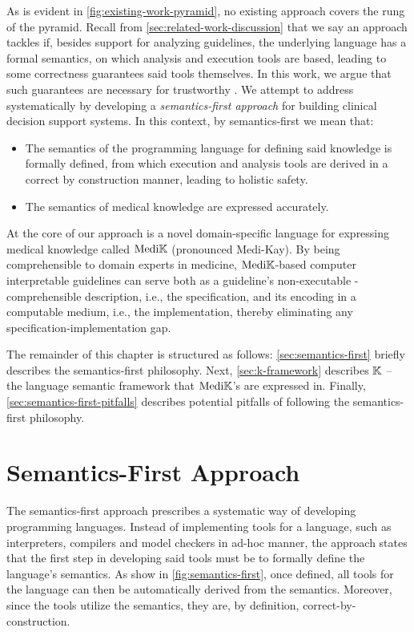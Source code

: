 As is evident in \autoref{fig:existing-work-pyramid}, no
existing approach covers the  rung of the pyramid.
Recall from \autoref{sec:related-work-discussion} that we say an
approach tackles  if,
besides support for analyzing guidelines, the underlying
language has a formal semantics, on which
analysis and execution tools are based, leading to
some correctness guarantees said tools themselves.
In this work, we argue that such guarantees are necessary for
trustworthy \CDSSs{}. We attempt to address 
systematically by developing a \emph{semantics-first approach} for
building clinical decision support systems. In this context, by semantics-first
we mean that:
\begin{itemize}
  \item The semantics of the programming language for defining said knowledge is
    formally defined, from which execution and analysis tools are derived in a
    correct by construction manner, leading to holistic safety.
  \item The semantics of medical knowledge are expressed accurately.
\end{itemize}
At the core of our approach is a novel domain-specific language for expressing
medical knowledge called $\text{Medi}\mathbb{K}{}{}$ (pronounced Medi-Kay).
By being comprehensible to domain experts
in medicine, $\text{Medi}\mathbb{K}{}{}$-based computer interpretable guidelines can serve
both as a guideline's non-executable \HCP{}-comprehensible description, i.e.,
the specification, and its encoding in a computable medium, i.e., the
implementation, thereby eliminating any specification-implementation gap.

The remainder of this chapter is structured as follows:
\autoref{sec:semantics-first} briefly describes the semantics-first philosophy.
Next, \autoref{sec:k-framework} describes $\mathbb{K}$ -- the language semantic
framework that $\text{Medi}\mathbb{K}{}{}$'s are expressed in. Finally,
\autoref{sec:semantics-first-pitfalls} describes potential pitfalls
of following the semantics-first philosophy.

\section{Semantics-First Approach}\label{sec:semantics-first}

The semantics-first approach prescribes a systematic way of
developing programming languages. Instead of implementing
tools for a language, such as interpreters, compilers and
model checkers in ad-hoc manner, the approach states that the
first step in developing said tools must be to formally define
the language's semantics. As show in \autoref{fig:semantics-first},
once defined, all tools for the language
can then be automatically derived from the semantics. Moreover, since
the tools utilize the semantics, they are, by definition,
correct-by-construction.

